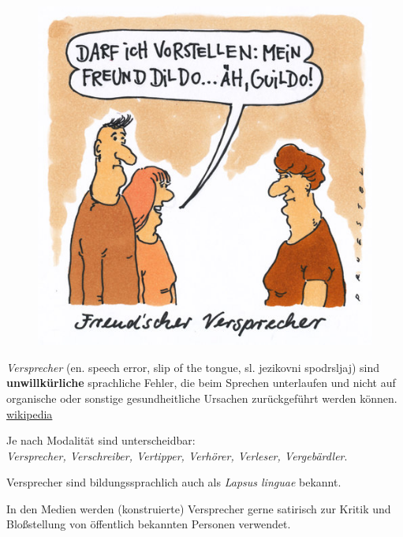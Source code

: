 \documentclass[
  letterpaper,
]{scrbook}
\begin{document}
\begin{figure}

{\centering 

\href{https://www.toonpool.com/cartoons/freudscher\%20versprecher_132853}{\includegraphics[width=1\textwidth,height=\textheight]{./pictures/freudscher_versprecher_1328535.jpg}}

}

\end{figure}

\emph{Versprecher} (en. speech error, slip of the tongue, sl. jezikovni
spodrsljaj) sind \textbf{unwillkürliche} sprachliche Fehler, die beim
Sprechen unterlaufen und nicht auf organische oder sonstige
gesundheitliche Ursachen zurückgeführt werden können.
\href{https://de.wikipedia.org/wiki/Versprecher}{wikipedia}

Je nach Modalität sind unterscheidbar:\\
\emph{Versprecher, Verschreiber, Vertipper, Verhörer, Verleser,
Vergebärdler}.

Versprecher sind bildungssprachlich auch als \emph{Lapsus linguae}
bekannt.

In den Medien werden (konstruierte) Versprecher gerne satirisch zur
Kritik und Bloßstellung von öffentlich bekannten Personen verwendet.
\end{document}
